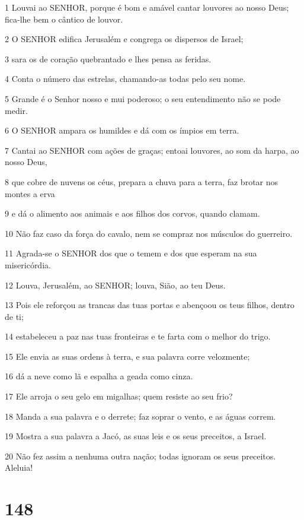 \par 1 Louvai ao SENHOR, porque é bom e amável cantar louvores ao nosso Deus; fica-lhe bem o cântico de louvor.
\par 2 O SENHOR edifica Jerusalém e congrega os dispersos de Israel;
\par 3 sara os de coração quebrantado e lhes pensa as feridas.
\par 4 Conta o número das estrelas, chamando-as todas pelo seu nome.
\par 5 Grande é o Senhor nosso e mui poderoso; o seu entendimento não se pode medir.
\par 6 O SENHOR ampara os humildes e dá com os ímpios em terra.
\par 7 Cantai ao SENHOR com ações de graças; entoai louvores, ao som da harpa, ao nosso Deus,
\par 8 que cobre de nuvens os céus, prepara a chuva para a terra, faz brotar nos montes a erva
\par 9 e dá o alimento aos animais e aos filhos dos corvos, quando clamam.
\par 10 Não faz caso da força do cavalo, nem se compraz nos músculos do guerreiro.
\par 11 Agrada-se o SENHOR dos que o temem e dos que esperam na sua misericórdia.
\par 12 Louva, Jerusalém, ao SENHOR; louva, Sião, ao teu Deus.
\par 13 Pois ele reforçou as trancas das tuas portas e abençoou os teus filhos, dentro de ti;
\par 14 estabeleceu a paz nas tuas fronteiras e te farta com o melhor do trigo.
\par 15 Ele envia as suas ordens à terra, e sua palavra corre velozmente;
\par 16 dá a neve como lã e espalha a geada como cinza.
\par 17 Ele arroja o seu gelo em migalhas; quem resiste ao seu frio?
\par 18 Manda a sua palavra e o derrete; faz soprar o vento, e as águas correm.
\par 19 Mostra a sua palavra a Jacó, as suas leis e os seus preceitos, a Israel.
\par 20 Não fez assim a nenhuma outra nação; todas ignoram os seus preceitos. Aleluia!

\chapter{148}

